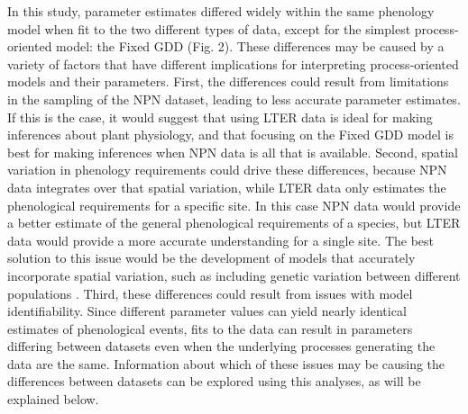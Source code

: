 \documentclass[fleqn,12pt,lineno]{wlpeerj} %
\begin{document}
In this study, parameter estimates differed widely within the same phenology model when fit to the two different types of data, except for the simplest process-oriented model: the Fixed GDD (Fig. 2). These differences may be caused by a variety of factors that have different implications for interpreting process-oriented models and their parameters. First, the differences could result from limitations in the sampling of the NPN dataset, leading to less accurate parameter estimates. If this is the case, it would suggest that using LTER data is ideal for making inferences about plant physiology, and that focusing on the Fixed GDD model is best for making inferences when NPN data is all that is available. Second, spatial variation in phenology requirements could drive these differences, because NPN data integrates over that spatial variation, while LTER data only estimates the phenological requirements for a specific site. In this case NPN data would provide a better estimate of the general phenological requirements of a species, but LTER data would provide a more accurate understanding for a single site. The best solution to this issue would be the development of models that accurately incorporate spatial variation, such as including genetic variation between different populations \citep{chuine2017}. Third, these differences could result from issues with model identifiability. Since different parameter values can yield nearly identical estimates of phenological events, fits to the data can result in parameters differing between datasets even when the underlying processes generating the data are the same. Information about which of these issues may be causing the differences between datasets can be explored using this analyses, as will be explained below.
\end{document}
